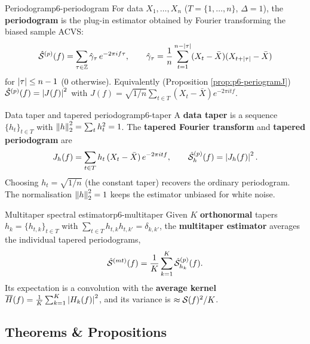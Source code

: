 \begin{definition}{Periodogram}{p6-periodogram}
For data $X_1,\dots,X_n$ ($T=\{1,\dots,n\}$, $\Delta=1$), the
\textbf{periodogram} is the plug-in estimator obtained by Fourier transforming
the biased sample ACVS:
\[
\hat{\mathcal{S}}^{(p)}(f)=\sum_{\tau\in\mathbb{Z}}\hat{\gamma}_\tau\,e^{-2\pi i f\tau},
\qquad
\hat{\gamma}_\tau=\frac1n\sum_{t=1}^{n-\left\lvert \tau \right\rvert}(X_t-\bar X)(X_{t+\left\lvert \tau \right\rvert}-\bar X)
\]
for $\left\lvert \tau \right\rvert\le n-1$ ($0$ otherwise). Equivalently (Proposition
\ref{prop:p6-periogramJ}) $\hat{\mathcal{S}}^{(p)}(f)=\left\lvert J(f) \right\rvert^2$ with
$J(f)=\sqrt{1/n}\sum_{t\in T}(X_t-\bar X)e^{-2\pi i t f}$.
\end{definition}

\begin{definition}{Data taper and tapered periodogram}{p6-taper}
A \textbf{data taper} is a sequence $\{h_t\}_{t\in T}$ with
$\left\lVert h \right\rVert_2^2=\sum_t h_t^2=1$. The \textbf{tapered Fourier transform} and
\textbf{tapered periodogram} are
\[
J_h(f)=\sum_{t\in T} h_t\,(X_t-\bar X)\,e^{-2\pi i t f},
\qquad
\hat{\mathcal{S}}^{(p)}_h(f)=\left\lvert J_h(f) \right\rvert^2 .
\]
Choosing $h_t=\sqrt{1/n}$ (the constant taper) recovers the ordinary
periodogram. The normalisation $\left\lVert h \right\rVert_2^2=1$ keeps the estimator unbiased
for white noise.
\end{definition}

\begin{definition}{Multitaper spectral estimator}{p6-multitaper}
Given $K$ \textbf{orthonormal} tapers $h_k=\{h_{t,k}\}_{t\in T}$ with
$\sum_{t\in T} h_{t,k}h_{t,k'}=\delta_{k,k'}$, the \textbf{multitaper
estimator} averages the individual tapered periodograms,
\[
\hat{\mathcal{S}}^{(mt)}(f)=\frac1K\sum_{k=1}^{K}\hat{\mathcal{S}}^{(p)}_{h_k}(f).
\]
Its expectation is a convolution with the \textbf{average kernel}
$\overline H(f)=\tfrac1K\sum_{k=1}^K\left\lvert H_k(f) \right\rvert^2$, and its variance is
$\approx\mathcal{S}(f)^2/K$.
\end{definition}

\subsection{Theorems \& Propositions}

